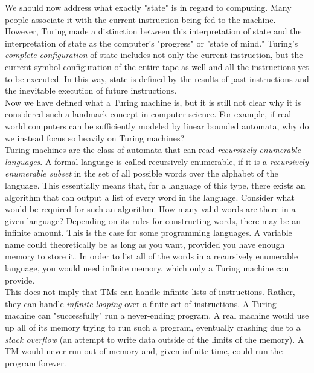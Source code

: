 We should now address what exactly "state" is in regard to computing. Many people associate it with the current instruction being fed to the machine. However, Turing made a distinction between this interpretation of state and the interpretation of state as the computer's "progress" or "state of mind." Turing's \textit{complete configuration} of state includes not only the current instruction, but the current symbol configuration of the entire tape as well and all the instructions yet to be executed. In this way, state is defined by the results of past instructions and the inevitable execution of future instructions. \\

Now we have defined what a Turing machine is, but it is still not clear why it is considered such a landmark concept in computer science. For example, if real-world computers can be sufficiently modeled by linear bounded automata, why do we instead focus so heavily on Turing machines? \\

Turing machines are the class of automata that can read \textit{recursively enumerable languages}. A formal language is called recursively enumerable, if it is a \textit{recursively enumerable subset} in the set of all possible words over the alphabet of the language. This essentially means that, for a language of this type, there exists an algorithm that can output a list of every word in the language. Consider what would be required for such an algorithm. How many valid words are there in a given language? Depending on its rules for constructing words, there may be an infinite amount. This is the case for some programming languages. A variable name could theoretically be as long as you want, provided you have enough memory to store it. In order to list all of the words in a recursively enumerable language, you would need infinite memory, which only a Turing machine can provide. \\

This does not imply that TMs can handle infinite lists of instructions. Rather, they can handle \textit{infinite looping} over a finite set of instructions. A Turing machine can "successfully" run a never-ending program. A real machine would use up all of its memory trying to run such a program, eventually crashing due to a \textit{stack overflow} (an attempt to write data outside of the limits of the memory). A TM would never run out of memory and, given infinite time, could run the program forever. \\

